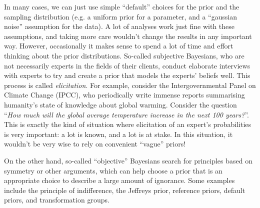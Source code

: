 In many cases, we can just use simple ``default'' choices for the prior and
the sampling distribution (e.g. a uniform prior for a parameter, and a
``gaussian noise'' assumption for the data). A lot of analyses work just fine
with these assumptions, and taking more care wouldn't change the results in
any important way. However, occasionally it makes sense to spend a lot of
time and effort thinking about the prior distributions.
So-called subjective Bayesians, who are not
necessarily experts in the fields of their clients, conduct elaborate interviews
with experts to try and create a prior that models the experts' beliefs well.
This process is called {\it elicitation}.
For example, consider the Intergovernmental Panel on Climate Change (IPCC),
who periodically write immense reports summarising humanity's state of knowledge
about global warming.
Consider the question ``{\it How much will the global average temperature
increase in the next 100 years?}''. This is exactly the kind of situation where
elicitation of an expert's probabilities is very important: a lot is known,
and a lot is at stake. In this situation, it wouldn't be very wise to rely on
convenient ``vague'' priors!

On the other hand, so-called ``objective'' Bayesians search for principles
based on symmetry or other arguments, which can help choose a prior that is
an appropriate choice to describe a large amount of ignorance. Some examples
include the principle of indifference, the Jeffreys prior, reference priors,
default priors, and transformation groups.

